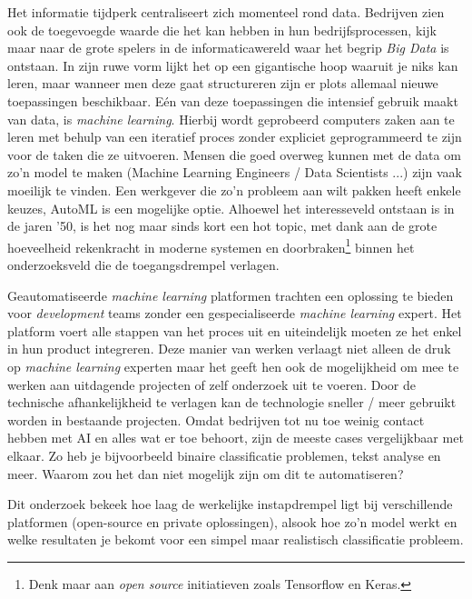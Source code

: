 \documentclass[a0,portrait]{a0poster}
\begin{document}
\begin{multicols}{2}
Het informatie tijdperk centraliseert zich momenteel rond data. Bedrijven zien ook de toegevoegde waarde die het kan hebben in hun bedrijfsprocessen, kijk maar naar de grote spelers in de informaticawereld waar het begrip \textit{Big Data} is ontstaan. In zijn ruwe vorm lijkt het op een gigantische hoop waaruit je niks kan leren, maar wanneer men deze gaat structureren zijn er plots allemaal nieuwe toepassingen beschikbaar. 
Eén van deze toepassingen die intensief gebruik maakt van data, is \textit{machine learning}. Hierbij wordt geprobeerd computers zaken aan te leren met behulp van een iteratief proces zonder expliciet geprogrammeerd te zijn voor de taken die ze uitvoeren. Mensen die goed overweg kunnen met de data om zo'n model te maken (Machine Learning Engineers / Data Scientists ...)  zijn vaak moeilijk te vinden. Een werkgever die zo'n probleem aan wilt pakken heeft enkele keuzes, AutoML is een mogelijke optie. Alhoewel het interesseveld ontstaan is in de jaren '50, is het nog maar sinds kort een hot topic, met dank aan de grote hoeveelheid rekenkracht in moderne systemen en doorbraken\footnote{Denk maar aan \textit{open source} initiatieven zoals Tensorflow en Keras.} binnen het onderzoeksveld die de toegangsdrempel verlagen.

Geautomatiseerde \textit{machine learning} platformen trachten een oplossing te bieden voor \textit{development} teams zonder een gespecialiseerde \textit{machine learning} expert. Het platform voert alle stappen van het proces uit en uiteindelijk moeten ze het enkel in hun product integreren. Deze manier van werken verlaagt niet alleen de druk op \textit{machine learning} experten maar het geeft hen ook de mogelijkheid om mee te werken aan uitdagende projecten of zelf onderzoek uit te voeren. Door de technische afhankelijkheid te verlagen kan de technologie sneller / meer gebruikt worden in bestaande projecten. Omdat bedrijven tot nu toe weinig contact hebben met AI en alles wat er toe behoort, zijn de meeste cases vergelijkbaar met elkaar. Zo heb je bijvoorbeeld binaire classificatie problemen, tekst analyse en meer. Waarom zou het dan niet mogelijk zijn om dit te automatiseren? 

Dit onderzoek bekeek hoe laag de werkelijke instapdrempel ligt bij verschillende platformen (open-source en private oplossingen), alsook hoe zo'n model werkt en welke resultaten je bekomt voor een simpel maar realistisch classificatie probleem.



\end{multicols}
\end{document}
